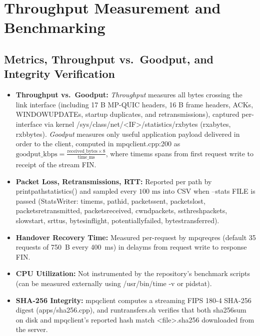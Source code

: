 \documentclass[10pt,a4paper]{article}
\newcommand{\codeul}{\textunderscore\hspace{0pt}}
\DeclareRobustCommand{\code}[1]{{\ttfamily\let\_\codeul #1}}
\begin{document}
\section{Throughput Measurement and Benchmarking}
\label{sec:bench}

\subsection{Metrics, Throughput vs.\ Goodput, and Integrity Verification}
\begin{itemize}
    \item \textbf{Throughput vs.\ Goodput:} \emph{Throughput} measures all bytes crossing the link interface (including 17 B MP-QUIC headers, 16 B frame headers, ACKs, \code{WINDOW\_UPDATE}s, startup duplicates, and retransmissions), captured per-interface via kernel \code{/sys/class/net/<IF>/statistics/rx\_bytes} (\code{rx\_a\_bytes}, \code{rx\_b\_bytes}). \emph{Goodput} measures only useful application payload delivered in order to the client, computed in \code{mpq\_client.cpp:200} as $\text{goodput\_kbps} = \frac{\text{received\_bytes} \times 8}{\text{time\_ms}}$, where \code{time\_ms} spans from first request write to receipt of the stream \code{FIN}.
    \item \textbf{Packet Loss, Retransmissions, RTT:} Reported per path by \code{print\_path\_statistics()} and sampled every $100\text{ ms}$ into CSV when \code{--stats FILE} is passed (\code{StatsWriter}: \code{time\_ms}, \code{path\_id}, \code{packets\_sent}, \code{packets\_lost}, \code{packets\_retransmitted}, \code{packets\_received}, \code{cwnd\_packets}, \code{ssthresh\_packets}, \code{slow\_start}, \code{srtt\_us}, \code{bytes\_in\_flight}, \code{potentially\_failed}, \code{bytes\_transferred}).
    \item \textbf{Handover Recovery Time:} Measured per-request by \code{mpq\_reqres} (default 35 requests of 750~B every 400~ms) in \code{delay\_ms} from request write to response \code{FIN}.
    \item \textbf{CPU Utilization:} Not instrumented by the repository's benchmark scripts (can be measured externally using \code{/usr/bin/time -v} or \code{pidstat}).
    \item \textbf{SHA-256 Integrity:} \code{mpq\_client} computes a streaming FIPS 180-4 SHA-256 digest (\code{apps/sha256.cpp}), and \code{run\_transfers.sh} verifies that both \code{sha256sum} on disk and \code{mpq\_client}'s reported hash match \code{<file>.sha256} downloaded from the server.

\end{itemize}
\end{document}
